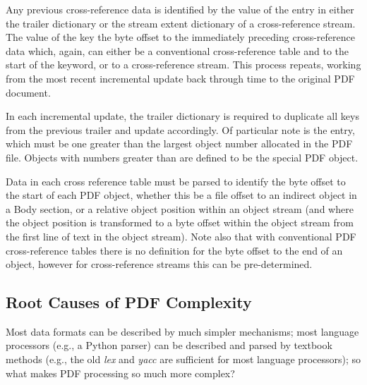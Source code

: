 Any previous cross-reference data is identified by the value of the  entry in either
the trailer dictionary or the stream extent dictionary of a cross-reference stream. The
value of the  key the byte offset to the immediately
preceding cross-reference data which, again, can either be a conventional
cross-reference table and to the start of the  keyword, or to a
cross-reference stream. This process repeats, working from the most recent incremental
update back through time to the original PDF document.

In each incremental update, the trailer dictionary is required to duplicate all keys from the previous
trailer and update accordingly. Of particular note is the  entry, which must be
one greater than the largest object number allocated in the PDF file. Objects with numbers greater
than  are defined to be the special PDF  object.

Data in each cross reference table must be parsed to
identify the byte offset to the start of each PDF object, whether this be a file offset to an indirect object in a Body section, or a relative object position within an object stream (and where the object position is transformed to a byte offset within the object stream from the first line of text in the object stream). Note also that with conventional PDF cross-reference tables there is no definition for the byte offset to the end of an object, however for cross-reference streams this can be pre-determined.


\subsection{Root Causes of PDF Complexity}
\label{sec:rootcause}

Most data formats can be described by much simpler mechanisms;
most language processors (e.g., a Python parser) can be described and parsed by
textbook methods (e.g., the old \emph{lex} and \emph{yacc} are sufficient for
most language processors);
so what makes PDF processing so much more complex?

